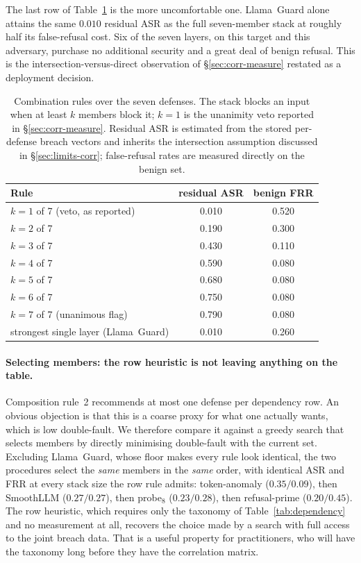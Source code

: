 The last row of Table~\ref{tab:combrules} is the more uncomfortable one. Llama~Guard alone
attains the same $0.010$ residual ASR as the full seven-member stack at roughly half its
false-refusal cost. Six of the seven layers, on this target and this adversary, purchase no
additional security and a great deal of benign refusal. This is the intersection-versus-direct
observation of \S\ref{sec:corr-measure} restated as a deployment decision.

\begin{table}[t]
\centering
\caption{Combination rules over the seven defenses. The stack blocks an input when at least
$k$ members block it; $k=1$ is the unanimity veto reported in \S\ref{sec:corr-measure}.
Residual ASR is estimated from the stored per-defense breach vectors and inherits the
intersection assumption discussed in \S\ref{sec:limits-corr}; false-refusal rates are
measured directly on the benign set.}
\label{tab:combrules}
\begin{tabular}{lcc}
\toprule
Rule & residual ASR & benign FRR \\
\midrule
$k=1$ of 7 (veto, as reported) & 0.010 & 0.520 \\
$k=2$ of 7                     & 0.190 & 0.300 \\
$k=3$ of 7                     & 0.430 & 0.110 \\
$k=4$ of 7                     & 0.590 & 0.080 \\
$k=5$ of 7                     & 0.680 & 0.080 \\
$k=6$ of 7                     & 0.750 & 0.080 \\
$k=7$ of 7 (unanimous flag)    & 0.790 & 0.080 \\
\midrule
strongest single layer (Llama~Guard) & 0.010 & 0.260 \\
\bottomrule
\end{tabular}
\end{table}

\paragraph{Selecting members: the row heuristic is not leaving anything on the table.}
Composition rule~2 recommends at most one defense per dependency row. An obvious objection is
that this is a coarse proxy for what one actually wants, which is low double-fault. We
therefore compare it against a greedy search that selects members by directly minimising
double-fault with the current set. Excluding Llama~Guard, whose floor makes every rule look
identical, the two procedures select the \emph{same} members in the \emph{same} order, with
identical ASR and FRR at every stack size the row rule admits: token-anomaly
($0.35/0.09$), then SmoothLLM ($0.27/0.27$), then probe$_{8}$ ($0.23/0.28$), then
refusal-prime ($0.20/0.45$). The row heuristic, which requires only the taxonomy of
Table~\ref{tab:dependency} and no measurement at all, recovers the choice made by a search
with full access to the joint breach data. That is a useful property for practitioners, who
will have the taxonomy long before they have the correlation matrix.

